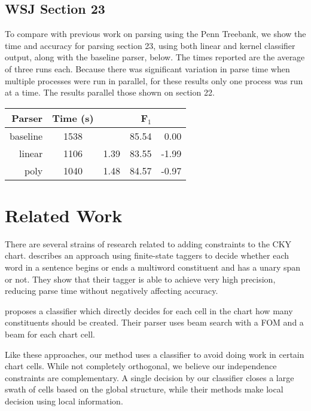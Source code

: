 \documentclass[11pt]{article}
\begin{document}
\subsection{WSJ Section 23}
\label{sec-5-4}

To compare with previous work on parsing using the Penn Treebank, we
show the time and accuracy for parsing section 23, using both linear
and kernel classifier output, along with the baseline parser, below.
The times reported are the average of three runs each. Because there
was significant variation in parse time when multiple processes were
run in parallel, for these results only one process was run at a time.
The results parallel those shown on section 22.

\begin{center}
\begin{tabular}{rc@{}lrr}
Parser & Time (s) &  & F$_{\text{1}}$ & \\
\hline
baseline & 1538 &  & 85.54 & 0.00\\
linear & 1106 & \texttimes{}1.39 & 83.55 & -1.99\\
poly & 1040 & \texttimes{}1.48 & 84.57 & -0.97\\
\end{tabular}
\end{center}

\section{Related Work}
\label{sec-6}

There are several strains of research related to adding constraints to
the CKY chart. \cite{Roark2012} describes an approach using
finite-state taggers to decide whether each word in a sentence begins
or ends a multiword constituent and has a unary span or not. They show
that their tagger is able to achieve very high precision, reducing
parse time without negatively affecting accuracy.

\cite{Bodenstab2011} proposes a classifier which directly decides for
each cell in the chart how many constituents should be created. Their
parser uses beam search with a FOM and a beam for each chart cell.

Like these approaches, our method uses a classifier to avoid doing
work in certain chart cells. While not completely orthogonal, we
believe our independence constraints are complementary. A single
decision by our classifier closes a large swath of cells based on the
global structure, while their methods make local decision using local
information.
\end{document}
